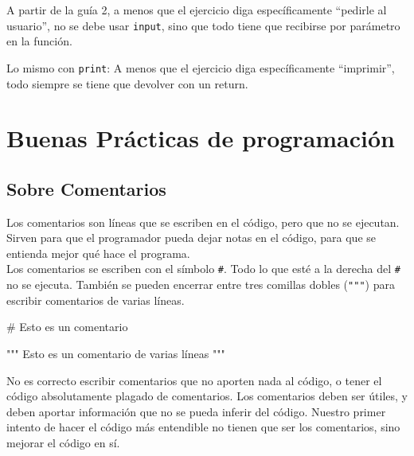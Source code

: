 \documentclass[
  letterpaper,
  DIV=11,
  numbers=noendperiod]{scrreprt}
\newenvironment{Shaded}{\begin{snugshade}}{\end{snugshade}}
\newcommand{\CommentTok}[1]{\textcolor[rgb]{0.37,0.37,0.37}{#1}}
\begin{document}
\begin{tcolorbox}[enhanced jigsaw, arc=.35mm, toptitle=1mm, colframe=quarto-callout-warning-color-frame, bottomtitle=1mm, opacitybacktitle=0.6, colbacktitle=quarto-callout-warning-color!10!white, leftrule=.75mm, coltitle=black, toprule=.15mm, titlerule=0mm, title=\textcolor{quarto-callout-warning-color}{\faExclamationTriangle}\hspace{0.5em}{¡Cuidado!}, bottomrule=.15mm, rightrule=.15mm, colback=white, breakable, opacityback=0, left=2mm]

A partir de la guía 2, a menos que el ejercicio diga específicamente
``pedirle al usuario'', no se debe usar \texttt{input}, sino que todo
tiene que recibirse por parámetro en la función.

Lo mismo con \texttt{print}: A menos que el ejercicio diga
específicamente ``imprimir'', todo siempre se tiene que devolver con un
return.

\end{tcolorbox}

\section{Buenas Prácticas de
programación}\label{buenas-pruxe1cticas-de-programaciuxf3n}

\subsection{Sobre Comentarios}\label{sobre-comentarios}

Los comentarios son líneas que se escriben en el código, pero que no se
ejecutan. Sirven para que el programador pueda dejar notas en el código,
para que se entienda mejor qué hace el programa.\\
Los comentarios se escriben con el símbolo \texttt{\#}. Todo lo que esté
a la derecha del \texttt{\#} no se ejecuta. También se pueden encerrar
entre tres comillas dobles (\texttt{"""}) para escribir comentarios de
varias líneas.

\begin{Shaded}
\begin{Highlighting}[]
\CommentTok{\# Esto es un comentario}

\CommentTok{""" Esto es un comentario}
\CommentTok{de varias líneas """}
\end{Highlighting}
\end{Shaded}

No es correcto escribir comentarios que no aporten nada al código, o
tener el código absolutamente plagado de comentarios. Los comentarios
deben ser útiles, y deben aportar información que no se pueda inferir
del código. Nuestro primer intento de hacer el código más entendible no
tienen que ser los comentarios, sino mejorar el código en sí.
\end{document}
